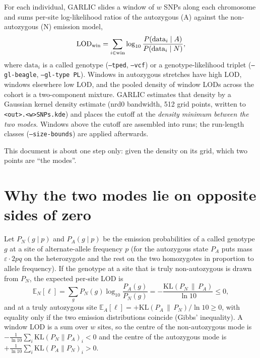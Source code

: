 \documentclass[11pt]{article}
\newcommand{\lod}{\mathrm{LOD}}
\newcommand{\KL}{\mathrm{KL}}
\newcommand{\code}[1]{\texttt{#1}}
\begin{document}
For each individual, GARLIC slides a window of $w$ SNPs along each chromosome and sums per-site log-likelihood ratios of the autozygous (A) against the non-autozygous (N) emission model,
\[
\lod_{\rm win} = \sum_{i\in \rm win} \log_{10}\frac{P(\text{data}_i\mid A)}{P(\text{data}_i\mid N)},
\]
where $\text{data}_i$ is a called genotype (\code{--tped}, \code{--vcf}) or a genotype-likelihood triplet (\code{--gl-beagle}, \code{--gl-type PL}). Windows in autozygous stretches have high LOD, windows elsewhere low LOD, and the pooled density of window LODs across the cohort is a two-component mixture. GARLIC estimates that density by a Gaussian kernel density estimate (nrd0 bandwidth, 512 grid points, written to \code{<out>.<w>SNPs.kde}) and places the cutoff at the \emph{density minimum between the two modes}. Windows above the cutoff are assembled into runs; the run-length classes (\code{--size-bounds}) are applied afterwards.

This document is about one step only: given the density on its grid, which two points are ``the modes''.

\section{Why the two modes lie on opposite sides of zero}
\label{sec:sign}

Let $P_N(g\mid p)$ and $P_A(g\mid p)$ be the emission probabilities of a called genotype $g$ at a site of alternate-allele frequency $p$ (for the autozygous state $P_A$ puts mass $\varepsilon\cdot 2pq$ on the heterozygote and the rest on the two homozygotes in proportion to allele frequency). If the genotype at a site that is truly non-autozygous is drawn from $P_N$, the expected per-site LOD is
\[
\mathbb{E}_N[\ell] = \sum_g P_N(g)\log_{10}\frac{P_A(g)}{P_N(g)} = -\frac{\KL(P_N\,\|\,P_A)}{\ln 10} \le 0,
\]
and at a truly autozygous site $\mathbb{E}_A[\ell] = +\KL(P_A\,\|\,P_N)/\ln 10 \ge 0$, with equality only if the two emission distributions coincide (Gibbs' inequality). A window LOD is a sum over $w$ sites, so the centre of the non-autozygous mode is $-\frac{1}{\ln 10}\sum_i \KL(P_N\|P_A)_i<0$ and the centre of the autozygous mode is $+\frac{1}{\ln 10}\sum_i\KL(P_A\|P_N)_i>0$.
\end{document}
